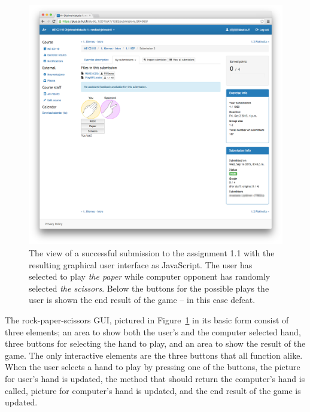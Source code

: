 \begin{figure}[!hb]
	\begin{center}
		\includegraphics[width=\textwidth]{images/assignment1_1-mod.png}
	\end{center}
	\caption[asdf]{\small{The view of a successful submission to the assignment 1.1 with the resulting graphical user interface as JavaScript. The user has selected to play \emph{the paper} while computer opponent has randomly selected \emph{the scissors}. Below the buttons for the possible plays the user is shown the end result of the game -- in this case defeat.}}
	\label{figure:assignment1_1}
\end{figure}

The rock-paper-scissors GUI, pictured in Figure~\ref{figure:assignment1_1} in its basic form consist of three elements; an area to show both the user's and the computer selected hand, three buttons for selecting the hand to play, and an area to show the result of the game. The only interactive elements are the three buttons that all function alike. When the user selects a hand to play by pressing one of the buttons, the picture for user's hand is updated, the method that should return the computer's hand is called, picture for computer's hand is updated, and the end result of the game is updated.

